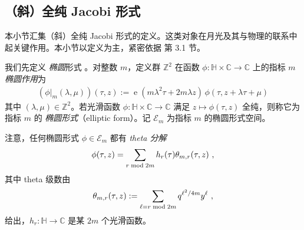 \documentclass[11pt,a4paper,fontset=windows]{ctexart}
\numberwithin{equation}{section}
\newcommand{\SL}{\operatorname{\textsl{SL}}}      %
\newcommand{\CC}{\mathbb{C}}
\newcommand{\HH}{\mathbb{H}}
\newcommand{\ZZ}{\mathbb{Z}}
\newcommand{\E}{\mathcal{E}}
\newcommand{\Z}{\mathbb{Z}}
\newcommand{\xmod}{{\rm \;mod\;}}
\def\f{\phi}
\def\l{\lambda}
\def\m{\mu}
\def\t{\tau}
\def\th{\theta}
\newcommand{\ex}{\operatorname{e}} %
\begin{document}



\subsection{（斜）全纯 Jacobi 形式}
\label{subsec:shjacobiforms}

本小节汇集（斜）全纯 Jacobi 形式的定义。这类对象在月光及其与物理的联系中起关键作用。本小节以定义为主，紧密依据 \cite{omjt} 第 3.1 节。

我们先定义 {\it 椭圆}形式 \cite{Dabholkar:2012nd}。对整数 $m$，定义群 $\ZZ^2$ 在函数 $\phi:\HH\times\CC\to \CC$ 上的指标 $m$ {\em 椭圆作用}为
\begin{gather} \label{elliptic}
(\f\lvert_{m} (\l,\m) )(\t,z) := \ex( m\l^2 \t + 2m\l z) \, \f(\t, z+\l \t +\m)
\end{gather}
其中 $(\l,\m)\in \ZZ^2$。若光滑函数 $\phi:\HH\times\CC\to\CC$ 满足 $z\mapsto\phi(\t,z)$ 全纯，则称它为指标 $m$ 的 {\it 椭圆形式}（elliptic form）。记 $\E_m$ 为指标 $m$ 的椭圆形式空间。


注意，任何椭圆形式 $\phi\in\E_m$ 都有 {\em theta 分解}
\begin{gather}\label{eqn:jac:thtdec}
\phi(\tau,z)=\sum_{r\xmod 2m} h_r(\tau)\theta_{m,r}(\tau,z)~,
\end{gather}
其中 theta 级数由 $$\theta_{m,r}(\tau,z):=\sum_{\ell=r\xmod 2m}q^{\ell^2/4m}y^\ell~,$$
给出，$h_r:\HH\to \CC$ 是某 $2m$ 个光滑函数。
\end{document}
